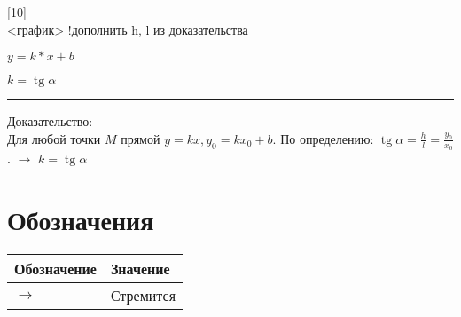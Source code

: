 \documentclass{article}
\DeclareMathOperator{\tg}{tg}
\begin{document}
[10]\\
<график> !дополнить h, l из доказательства

$y = k * x + b$

$k = \tg \alpha$

\noindent\rule{\textwidth}{1pt}

Доказательство:\\
Для любой точки $M$ прямой $y = k x, y_0 = kx_0 + b$. По определению: $\tg \alpha = \frac{h}{l} = \frac{y_0}{x_0}$. $\rightarrow$ $k = \tg \alpha$















\newpage
\section{Обозначения}
\begin{tabular}{ | l | l | }
	\hline
	Обозначение & Значение \\ \hline
	$\to$ & Стремится \\
	\hline
\end{tabular}


\newpage


\end{document}
